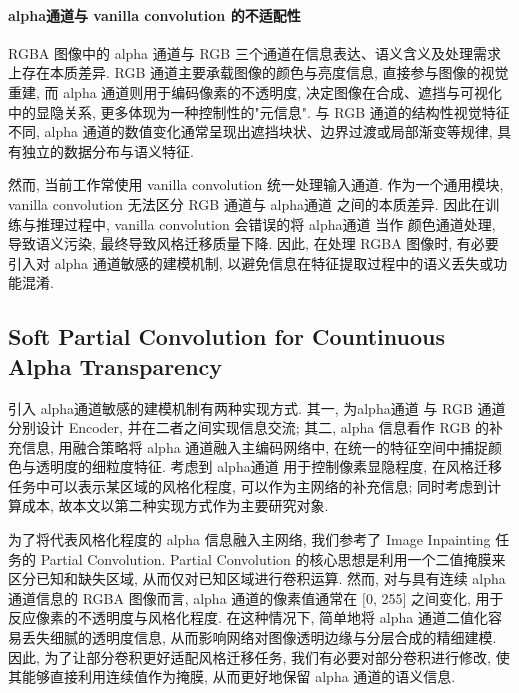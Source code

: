 \paragraph{alpha通道与 vanilla convolution 的不适配性}

RGBA 图像中的 alpha 通道与 RGB 三个通道在信息表达、语义含义及处理需求上存在本质差异. RGB 通道主要承载图像的颜色与亮度信息, 直接参与图像的视觉重建, 而 alpha 通道则用于编码像素的不透明度, 决定图像在合成、遮挡与可视化中的显隐关系, 更多体现为一种控制性的"元信息". 与 RGB 通道的结构性视觉特征不同, alpha 通道的数值变化通常呈现出遮挡块状、边界过渡或局部渐变等规律, 具有独立的数据分布与语义特征. 

然而, 当前工作常使用 vanilla convolution 统一处理输入通道. 作为一个通用模块, vanilla convolution 无法区分 RGB 通道与 alpha通道 之间的本质差异. 因此在训练与推理过程中, vanilla convolution 会错误的将 alpha通道 当作 颜色通道处理, 导致语义污染, 最终导致风格迁移质量下降. 因此, 在处理 RGBA 图像时, 有必要引入对 alpha 通道敏感的建模机制, 以避免信息在特征提取过程中的语义丢失或功能混淆.


\subsection{Soft Partial Convolution for Countinuous Alpha Transparency}

引入 alpha通道敏感的建模机制有两种实现方式. 其一, 为alpha通道 与 RGB 通道分别设计 Encoder, 并在二者之间实现信息交流; 其二, alpha 信息看作 RGB 的补充信息, 用融合策略将 alpha 通道融入主编码网络中, 在统一的特征空间中捕捉颜色与透明度的细粒度特征. 考虑到 alpha通道 用于控制像素显隐程度, 在风格迁移任务中可以表示某区域的风格化程度, 可以作为主网络的补充信息; 同时考虑到计算成本, 故本文以第二种实现方式作为主要研究对象.

为了将代表风格化程度的 alpha 信息融入主网络, 我们参考了 Image Inpainting 任务的 Partial Convolution\cite{liu2018image}. Partial Convolution 的核心思想是利用一个二值掩膜来区分已知和缺失区域, 从而仅对已知区域进行卷积运算. 然而, 对与具有连续 alpha 通道信息的 RGBA 图像而言, alpha 通道的像素值通常在 $[$0, 255$]$ 之间变化, 用于反应像素的不透明度与风格化程度. 在这种情况下, 简单地将 alpha 通道二值化容易丢失细腻的透明度信息, 从而影响网络对图像透明边缘与分层合成的精细建模. 因此, 为了让部分卷积更好适配风格迁移任务, 我们有必要对部分卷积进行修改, 使其能够直接利用连续值作为掩膜, 从而更好地保留 alpha 通道的语义信息.

